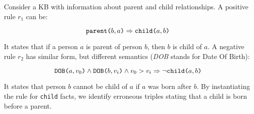 \begin{example}\label{ex:krd_intro}
	Consider a KB with information about parent and child relationships.
	A positive rule $r_1$ can be:
	
	\vspace{-2ex}
	{\small
		\begin{equation*}
			\texttt{parent(}b,a\texttt{)} \Rightarrow \texttt{child(}a,b\texttt{)}
		\end{equation*}
	} 
	\vspace{-2ex}
	
	\noindent
	It states that if a person $a$ is parent of person $b$, then $b$ is child of $a$. 
	A negative rule $r_2$ has similar form, but different semantics ({\em DOB} stands for Date Of Birth):
	
	\vspace{-2ex}
	{\small
		\begin{equation*}
			\texttt{DOB(}a,v_0\texttt{)} \wedge \texttt{DOB(}b,v_i\texttt{)} \wedge v_0 > v_i  \Rightarrow \neg \texttt{child(}a,b\texttt{)}
		\end{equation*}
	} 
	\vspace{-2ex}
	
	\noindent It states that person $b$ cannot be child of $a$ if $a$ was born after $b$. By instantiating the rule for \texttt{child} facts, we identify erroneous triples stating that a child is born before a parent.
\end{example}

